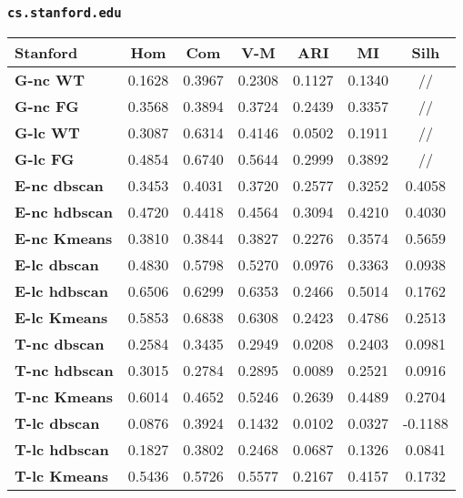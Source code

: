 \subsubsection{\texttt{cs.stanford.edu}}

\begin{table}[H]
	\begin{tabular}{| l | c | c | c | c | c | c |}
	\hline
	\textbf{Stanford}  & \textbf{Hom} & \textbf{Com} & \textbf{V-M}  & \textbf{ARI}  & \textbf{MI} & \textbf{Silh} \\ [2ex] 
	\hline
	\textbf{G-nc WT} & 0.1628 & 0.3967 & 0.2308 & 0.1127 & 0.1340 & // \\[2ex]
	 \hline
	\textbf{G-nc FG} & 0.3568 & 0.3894 & 0.3724 & 0.2439 & 0.3357 & // \\[2ex]
	 \hline	
	\textbf{G-lc WT} & 0.3087 & 0.6314 & 0.4146 & 0.0502 & 0.1911 & // \\[2ex]
	 \hline	
	\textbf{G-lc FG} & 0.4854 & 0.6740 & 0.5644 & 0.2999 & 0.3892 & // \\ [2ex]
	\hline

	\textbf{E-nc dbscan} & 0.3453 & 0.4031 & 0.3720 & 0.2577 & 0.3252 & 0.4058\\ [2ex]
	 \hline 
	\textbf{E-nc hdbscan} & 0.4720 & 0.4418 & 0.4564 & 0.3094 & 0.4210 & 0.4030\\ [2ex]
	 \hline
	\textbf{E-nc Kmeans} & 0.3810 & 0.3844 & 0.3827 & 0.2276 & 0.3574 & 0.5659\\ [2ex]
	 \hline	
	\textbf{E-lc dbscan} & 0.4830 & 0.5798 & 0.5270 & 0.0976 & 0.3363 & 0.0938\\ [2ex]
	\hline
	\textbf{E-lc hdbscan} & 0.6506 & 0.6299 & 0.6353 & 0.2466 & 0.5014 & 0.1762\\ [2ex]
	\hline
	\textbf{E-lc Kmeans} & 0.5853 & 0.6838 & 0.6308 & 0.2423 & 0.4786 & 0.2513\\ [2ex]
	\hline
	
	\textbf{T-nc dbscan} & 0.2584 & 0.3435 & 0.2949 & 0.0208 & 0.2403 & 0.0981\\ [2ex]
	 \hline 
	\textbf{T-nc hdbscan} & 0.3015 & 0.2784 & 0.2895 & 0.0089 & 0.2521 & 0.0916\\ [2ex]
	 \hline
	\textbf{T-nc Kmeans} & 0.6014 & 0.4652 & 0.5246 & 0.2639 & 0.4489 & 0.2704\\ [2ex]
	 \hline	
	\textbf{T-lc dbscan} & 0.0876 & 0.3924 & 0.1432 & 0.0102 & 0.0327 & -0.1188\\ [2ex]
	\hline
	\textbf{T-lc hdbscan} & 0.1827 & 0.3802 & 0.2468 & 0.0687 & 0.1326 & 0.0841\\ [2ex]
	\hline
	\textbf{T-lc Kmeans} & 0.5436 & 0.5726 & 0.5577 & 0.2167 & 0.4157 & 0.1732\\ [2ex]
	\hline


\end{tabular}
\end{table}
